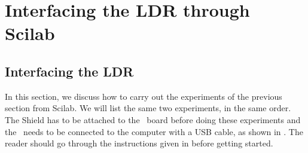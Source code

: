 \section{Interfacing the LDR through Scilab}
\subsection{Interfacing the LDR}
In this section, we discuss how to carry out the experiments of the
previous section from Scilab. We will list the same two experiments,
in the same order.  The Shield has to be attached to the \arduino\ board
before doing these experiments and the \arduino\ needs to be connected to the computer 
with a USB cable, as shown in .
The reader should go through the instructions given in
 before getting started. 


